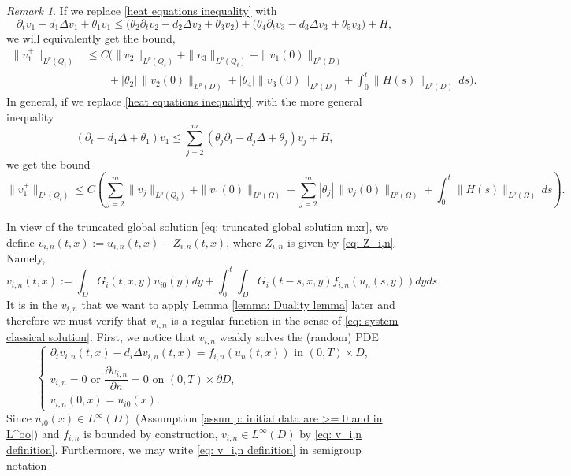 \documentclass[12pt]{article}
\theoremstyle{definition}
\theoremstyle{remark}
\newtheorem{remark}{Remark}
\begin{document}
\begin{remark}\label{Remark beneath duality lemma}
    If we replace \eqref{heat equations inequality} with
\begin{equation*}
\partial_t v_1 - d_1\Delta v_1 + \theta_1 v_1 \leq \Big( \theta_2\partial_t v_2 -d_2\Delta v_2 + \theta_3 v_2\Big)+\Big(\theta_4\partial_t v_3 - d_3\Delta v_3 + \theta_5 v_3\Big) + H,
\end{equation*}
we will equivalently get the bound,
\begin{align*}
\|v_1^+\|_{L^p(Q_t)}
&\le
C\Big(
\|v_2\|_{L^p(Q_t)}
+\|v_3\|_{L^p(Q_t)}
+\|v_1(0)\|_{L^p(D)}\\
&\qquad+|\theta_2|\,\|v_2(0)\|_{L^p(D)}+|\theta_4|\|v_3(0)\|_{L^p(D)}+\int_0^t \|H(s)\|_{L^p(D)}\,ds
\Big).
\end{align*}
In general, if we replace \eqref{heat equations inequality} with the more general inequality
\[
(\partial_t - d_1\Delta + \theta_1)v_1 \leq \sum\limits_{j=2}^m (\theta_j\partial_t  - d_j\Delta + \theta_j )v_{j}+H,
\]
we get the bound
\[
\|v_1^+\|_{L^p(Q_t)} \le C \left(
\sum_{j=2}^{m} \|v_j\|_{L^p(Q_t)}
+ \|v_1(0)\|_{L^p(\Omega)}
+ \sum_{j=2}^{m} |\theta_j| \, \|v_j(0)\|_{L^p(\Omega)}
+ \int_0^t \|H(s)\|_{L^p(\Omega)} \, ds
\right).
\]
\end{remark}
In view of the truncated global solution \eqref{eq: truncated global solution mxr}, we define $v_{i,n}(t,x):=u_{i,n}(t,x) - Z_{i,n}(t,x)$, where $Z_{i,n}$ is given by \eqref{eq: Z_i,n}. Namely,
\begin{equation}\label{eq: v_i,n definition}
v_{i,n}(t,x):=\int_D G_i(t,x,y)u_{i0}(y)dy + \int_0^t\int_D G_i(t-s,x,y)f_{i,n}(u_n(s,y))dyds.
\end{equation}
It is in the $v_{i,n}$ that we want to apply Lemma \ref{lemma: Duality lemma} later and therefore we must verify that $v_{i,n}$ is a regular function in the sense of \eqref{eq: system classical solution}. First, we notice that $v_{i,n}$ weakly solves the (random) PDE
\begin{equation}\label{eq: sys v_i,n}
\begin{cases}
    \partial_t v_{i,n}(t,x) - d_i\Delta v_{i,n}(t,x) = f_{i,n}(u_{n}(t,x)) \text{ in } (0,T)\times D,\\
    v_{i,n}=0 \text{ or } \dfrac{\partial v_{i,n}}{\partial n} = 0  \text{ on } (0,T)\times \partial D,\\
    v_{i,n}(0,x) = u_{i0}(x).
\end{cases}
\end{equation}
Since $u_{i0}(x)\in L^{\infty}(D)$ (Assumption \ref{assump: initial data are >= 0 and in L^oo}) and $f_{i,n}$ is bounded by construction, $v_{i,n}\in L^{\infty}(D)$ by \eqref{eq: v_i,n definition}. Furthermore, we may write \eqref{eq: v_i,n definition} in semigroup notation
\end{document}
